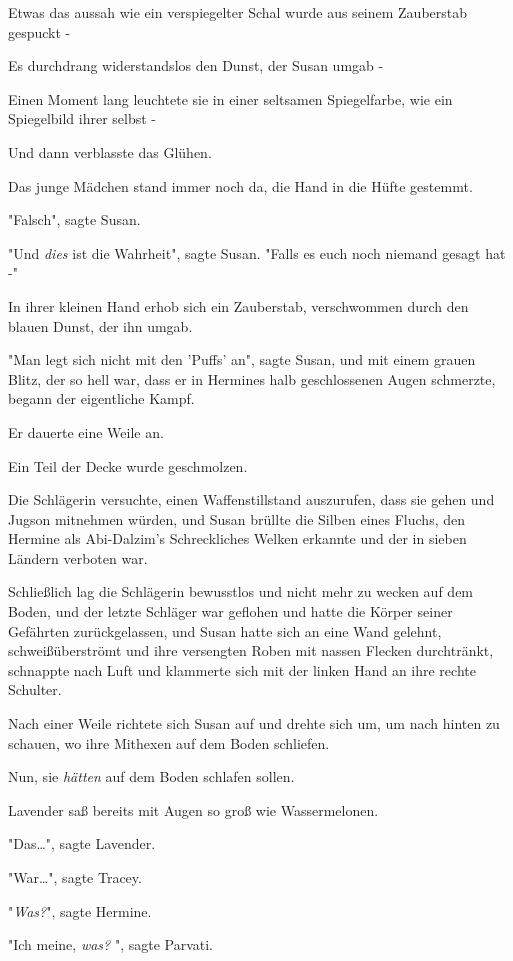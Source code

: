 {Etwas das aussah wie ein verspiegelter Schal wurde aus seinem Zauberstab gespuckt -

Es durchdrang widerstandslos den Dunst, der Susan umgab -

Einen Moment lang leuchtete sie in einer seltsamen Spiegelfarbe, wie ein Spiegelbild ihrer selbst -

Und dann verblasste das Glühen.

Das junge Mädchen stand immer noch da, die Hand in die Hüfte gestemmt.

"Falsch", sagte Susan.

"Und \emph{dies} ist die Wahrheit", sagte Susan. "Falls es euch noch niemand gesagt hat -"

In ihrer kleinen Hand erhob sich ein Zauberstab, verschwommen durch den blauen Dunst, der ihn umgab.

"Man legt sich nicht mit den 'Puffs' an", sagte Susan, und mit einem grauen Blitz, der so hell war, dass er in Hermines halb geschlossenen Augen schmerzte, begann der eigentliche Kampf.

Er dauerte eine Weile an.

Ein Teil der Decke wurde geschmolzen.

Die Schlägerin versuchte, einen Waffenstillstand auszurufen, dass sie gehen und Jugson mitnehmen würden, und Susan brüllte die Silben eines Fluchs, den Hermine als Abi-Dalzim's Schreckliches Welken erkannte und der in sieben Ländern verboten war.

Schließlich lag die Schlägerin bewusstlos und nicht mehr zu wecken auf dem Boden, und der letzte Schläger war geflohen und hatte die Körper seiner Gefährten zurückgelassen, und Susan hatte sich an eine Wand gelehnt, schweißüberströmt und ihre versengten Roben mit nassen Flecken durchtränkt, schnappte nach Luft und klammerte sich mit der linken Hand an ihre rechte Schulter.

Nach einer Weile richtete sich Susan auf und drehte sich um, um nach hinten zu schauen, wo ihre Mithexen auf dem Boden schliefen.

Nun, sie \emph{hätten} auf dem Boden schlafen sollen.

Lavender saß bereits mit Augen so groß wie Wassermelonen.

"Das…", sagte Lavender.

"War…", sagte Tracey.

"\emph{Was?}", sagte Hermine.

"Ich meine, \emph{was?} ", sagte Parvati.

}

